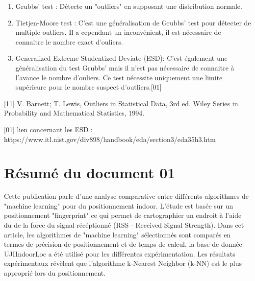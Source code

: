 \begin{enumerate}
	\item Grubbs' test : Détecte un "outliers" en supposant une distribution normale.
	\item Tietjen-Moore test : C'est une généralisation de Grubbs' test pour détecter de multiple outliers. Il a cependant un inconvénient, il est nécessaire de connaitre le nombre exact d'ouliers.
	\item Generalized Extreme Studentized Deviate (ESD): C'est également une généralisation du test Grubbs' mais il n'est pas nécessaire de connaitre à l'avance le nombre d'ouliers. Ce test nécessite uniquement une limite supérieure pour le nombre suspect d'outliers.[01]
\end{enumerate}

[11] V. Barnett; T. Lewis, Outliers in Statistical Data, 3rd ed. Wiley Series in Probability and Mathematical Statistics, 1994.

[01] lien concernant les ESD : https://www.itl.nist.gov/div898/handbook/eda/section3/eda35h3.htm

\section{Résumé du document 01}
Cette publication parle d'une analyse comparative entre différents algorithmes de "machine learning" pour du positionnement indoor. L'étude est basée sur un positionnement "fingerprint" ce qui permet de cartographier un endroit à l'aide du de la force du signal récéptionné (RSS - Received Signal Strength).
Dans cet article, les algorithmes de "machine learning" sélectionnés sont comparés en termes de précision de positionnement et de temps de calcul. la base de donnée UJIIndoorLoc a été utilisé pour les différentes expérimentation. Les résultats expérimentaux révèlent que l’algorithme k-Nearest Neighbor (k-NN) est le plus approprié lors du positionnement.

